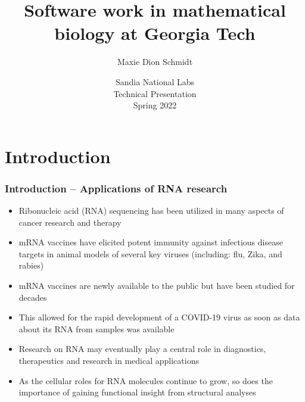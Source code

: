 \documentclass[usenames,svgnames,dvipsnames,11pt]{beamer}
\title[Sandia 2022 -- MathBio Software]{
     Software work in mathematical biology at Georgia Tech
}
\author{Maxie Dion Schmidt} %
\institute[] 
{
\texttt{maxieds@gmail.com} \\ 
\url{http://people.math.gatech.edu/~mschmidt34} \\ 
\url{https://github.com/maxieds}
}
\date[Spring 2022]{Sandia National Labs \\ Technical Presentation \\ Spring 2022} %
\begin{document}
\begin{frame}
\titlepage %
\end{frame} 



\section{Introduction} 

\begin{frame}
\frametitle{Introduction -- Applications of RNA research}
\begin{itemize} 

\item Ribonucleic acid (RNA) sequencing has been utilized in many aspects of cancer research and therapy 
\item mRNA vaccines have elicited potent immunity against infectious disease targets in animal models of 
      several key viruses (including: flu, Zika, and rabies)
\item mRNA vaccines are newly available to the public but have been studied for decades
\item This allowed for the rapid development of a COVID-19 virus as soon as data about its RNA from samples was available 
\item Research on RNA may eventually play a central role in diagnostics, therapeutics and research 
      in medical applications 
\item As the cellular roles for RNA molecules continue to grow, 
      so does the importance of gaining functional insight from structural analyses

\end{itemize}

\end{frame}
\end{document}

